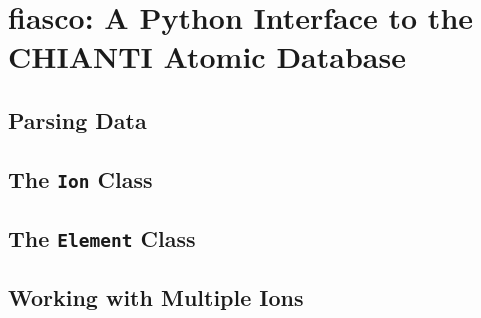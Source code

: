 \chapter{fiasco: A Python Interface to the CHIANTI Atomic Database}\label{ap:fiasco}

\section{Parsing Data}

\section{The \texttt{Ion} Class}

\section{The \texttt{Element} Class}

\section{Working with Multiple Ions}

